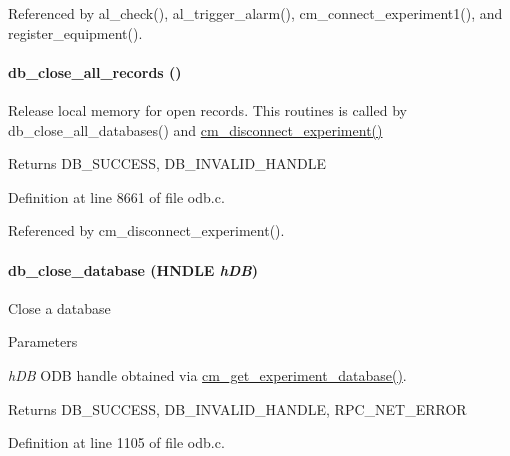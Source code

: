 Referenced by al\_\-check(), al\_\-trigger\_\-alarm(), cm\_\-connect\_\-experiment1(), and register\_\-equipment().
\paragraph[{db\_\-close\_\-all\_\-records}]{ db\_\-close\_\-all\_\-records ()}\hfill\label{group__odbfunctionc_ga8611a895b6ddf4cc6b25fed3c7473e3a}
Release local memory for open records. This routines is called by db\_\-close\_\-all\_\-databases() and \hyperlink{group__cmfunctionc_ga7d5a287821786e8dde3d2340826215b2}{cm\_\-disconnect\_\-experiment()} \begin{DoxyReturn}{Returns}
DB\_\-SUCCESS, DB\_\-INVALID\_\-HANDLE 
\end{DoxyReturn}


Definition at line 8661 of file odb.c.

Referenced by cm\_\-disconnect\_\-experiment().
\paragraph[{db\_\-close\_\-database}]{ db\_\-close\_\-database (HNDLE {\em hDB})}\hfill\label{group__odbfunctionc_gadbb92e13899bbffc584b676bb924586e}
Close a database 
\begin{DoxyParams}{Parameters}
\item[{\em hDB}]ODB handle obtained via \hyperlink{group__cmfunctionc_ga16b33b70783a3f5ba98b4094149d12b7}{cm\_\-get\_\-experiment\_\-database()}. \end{DoxyParams}
\begin{DoxyReturn}{Returns}
DB\_\-SUCCESS, DB\_\-INVALID\_\-HANDLE, RPC\_\-NET\_\-ERROR 
\end{DoxyReturn}


Definition at line 1105 of file odb.c.
